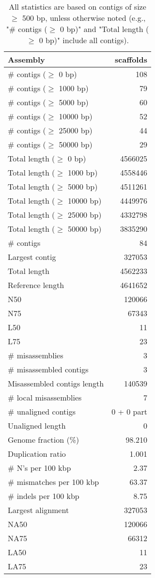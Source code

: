 \documentclass[12pt,a4paper]{article}
\begin{document}
\begin{table}[ht]
\begin{center}
\caption{All statistics are based on contigs of size $\geq$ 500 bp, unless otherwise noted (e.g., "\# contigs ($\geq$ 0 bp)" and "Total length ($\geq$ 0 bp)" include all contigs).}
\begin{tabular}{|l*{1}{|r}|}
\hline
Assembly & scaffolds \\ \hline
\# contigs ($\geq$ 0 bp) & 108 \\ \hline
\# contigs ($\geq$ 1000 bp) & 79 \\ \hline
\# contigs ($\geq$ 5000 bp) & 60 \\ \hline
\# contigs ($\geq$ 10000 bp) & 52 \\ \hline
\# contigs ($\geq$ 25000 bp) & 44 \\ \hline
\# contigs ($\geq$ 50000 bp) & 29 \\ \hline
Total length ($\geq$ 0 bp) & 4566025 \\ \hline
Total length ($\geq$ 1000 bp) & 4558446 \\ \hline
Total length ($\geq$ 5000 bp) & 4511261 \\ \hline
Total length ($\geq$ 10000 bp) & 4449976 \\ \hline
Total length ($\geq$ 25000 bp) & 4332798 \\ \hline
Total length ($\geq$ 50000 bp) & 3835290 \\ \hline
\# contigs & 84 \\ \hline
Largest contig & 327053 \\ \hline
Total length & 4562233 \\ \hline
Reference length & 4641652 \\ \hline
N50 & 120066 \\ \hline
N75 & 67343 \\ \hline
L50 & 11 \\ \hline
L75 & 23 \\ \hline
\# misassemblies & 3 \\ \hline
\# misassembled contigs & 3 \\ \hline
Misassembled contigs length & 140539 \\ \hline
\# local misassemblies & 7 \\ \hline
\# unaligned contigs & 0 + 0 part \\ \hline
Unaligned length & 0 \\ \hline
Genome fraction (\%) & 98.210 \\ \hline
Duplication ratio & 1.001 \\ \hline
\# N's per 100 kbp & 2.37 \\ \hline
\# mismatches per 100 kbp & 63.37 \\ \hline
\# indels per 100 kbp & 8.75 \\ \hline
Largest alignment & 327053 \\ \hline
NA50 & 120066 \\ \hline
NA75 & 66312 \\ \hline
LA50 & 11 \\ \hline
LA75 & 23 \\ \hline
\end{tabular}
\end{center}
\end{table}
\end{document}
